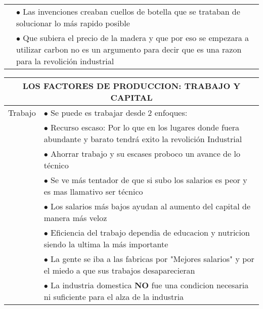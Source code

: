 \begin{tabular}{p{3cm}|p{12cm}}
                               & $\bullet$ Las invenciones creaban cuellos de botella que se trataban de solucionar lo más rapido posible                                                                  \\
                               & $\bullet$ Que subiera el precio de la madera y que por eso se empezara a utilizar carbon no es un argumento para decir que es una razon para la revolición industrial
\end{tabular}
\endgroup

\begingroup
\setlength{\tabcolsep}{12pt} %
\renewcommand{\arraystretch}{1.5} %
\begin{tabular}{p{3cm}|p{11cm}}
  \multicolumn{2}{c}{\large LOS FACTORES DE PRODUCCION: TRABAJO Y CAPITAL}                                                                                          \\ \hline
  Trabajo & $\bullet$ Se puede es trabajar desde 2 enfoques:                                                                                                        \\
          & \hspace{1cm} $\bullet$ Recurso escaso: Por lo que en los lugares donde fuera abundante y barato tendrá exito la revolición Industrial                  \\
          & \hspace{1cm} $\bullet$ Ahorrar trabajo y su escases proboco un avance de lo técnico                                                                     \\
          & $\bullet$ Se ve más tentador de que si subo los salarios es peor y es mas llamativo ser técnico                                                         \\
          & $\bullet$ Los salarios más bajos ayudan al aumento del capital de manera más veloz                                                                      \\
          & $\bullet$ Eficiencia del trabajo dependia de educacion y nutricion siendo la ultima la más importante                                                   \\
          & $\bullet$ La gente se iba a las fabricas por "Mejores salarios" y por el miedo a que sus trabajos desaparecieran                                        \\
          & $\bullet$ La industria domestica {\bf NO} fue una condicion necesaria ni suficiente para el alza de la industria                                        \\

\end{tabular}
